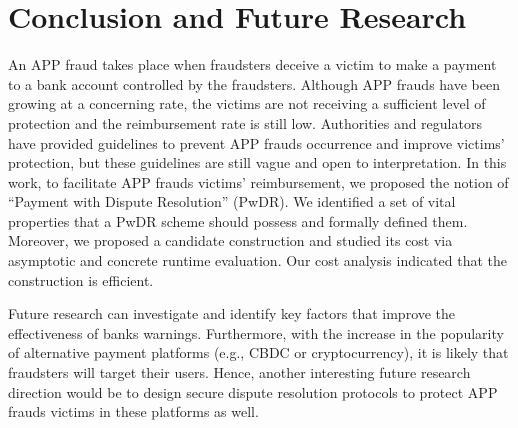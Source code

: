 
\section{Conclusion and Future Research}\label{sec::conclusion}


An APP fraud takes place when fraudsters deceive a victim to make a payment to a bank account controlled by the fraudsters. Although APP frauds have been growing at a concerning rate, the  victims are not receiving a sufficient level of protection and the reimbursement rate is still low. Authorities and regulators have  provided guidelines  to prevent APP frauds occurrence and improve victims’ protection, but these guidelines are still vague and open to interpretation. In this work, to facilitate APP frauds victims’ reimbursement,  we proposed the notion of “Payment with Dispute Resolution” (PwDR). We identified a set of vital properties that a PwDR scheme should possess and formally defined them. Moreover,  we proposed a candidate construction and  studied its cost via asymptotic and concrete runtime evaluation. Our cost analysis indicated that the construction is efficient. 



Future research can investigate and identify key factors that  improve the effectiveness of banks warnings.  Furthermore, with the increase in the popularity of  alternative payment platforms (e.g., CBDC or cryptocurrency), it is likely that  fraudsters will target their users. Hence, another interesting future research direction would be to design secure dispute resolution protocols  to protect  APP frauds victims in these platforms as well. 



